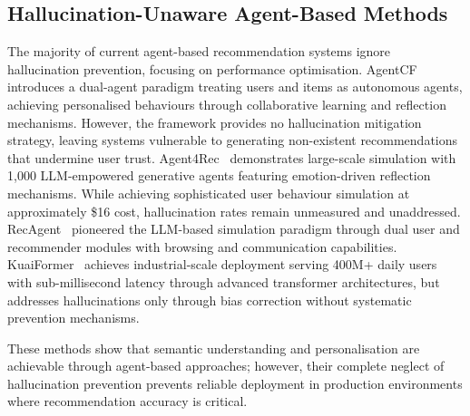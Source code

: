 \documentclass[acmsmall]{acmart}
\begin{document}
\subsection{Hallucination-Unaware Agent-Based Methods}
The majority of current agent-based recommendation systems ignore hallucination prevention, focusing on performance optimisation. AgentCF~\cite{zhang2024agentcf} introduces a dual-agent paradigm treating users and items as autonomous agents, achieving personalised behaviours through collaborative learning and reflection mechanisms. However, the framework provides no hallucination mitigation strategy, leaving systems vulnerable to generating non-existent recommendations that undermine user trust. Agent4Rec~\cite{zhang2024generative} demonstrates large-scale simulation with 1,000 LLM-empowered generative agents featuring emotion-driven reflection mechanisms. While achieving sophisticated user behaviour simulation at approximately \$16 cost, hallucination rates remain unmeasured and unaddressed. %
RecAgent~\cite{wang2025user} pioneered the LLM-based simulation paradigm through dual user and recommender modules with browsing and communication capabilities. KuaiFormer~\cite{kuaiformer2024} achieves industrial-scale deployment serving 400M+ daily users with sub-millisecond latency through advanced transformer architectures, but addresses hallucinations only through bias correction without systematic prevention mechanisms.

These methods show that semantic understanding and personalisation are achievable through agent-based approaches; however, their complete neglect of hallucination prevention prevents reliable deployment in production environments where recommendation accuracy is critical.
\end{document}
